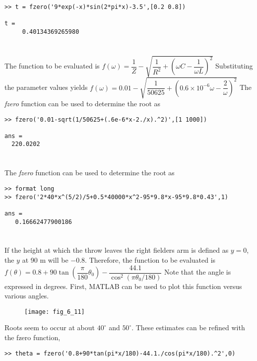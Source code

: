 \documentclass[../main.tex]{subfiles}
\begin{document}
\begin{enumerate}[label=\bfseries(\alph*)]
\begin{lstlisting}[numbers=none]
>> t = fzero('9*exp(-x)*sin(2*pi*x)-3.5',[0.2 0.8])

t =
 	 0.40134369265980
\end{lstlisting}
\bigbreak

\section{}
The function to be evaluated is
\bigbreak
$f(\omega)=\dfrac{1}{Z}-\sqrt{\dfrac{1}{R^{2}}+\left(\omega C-\dfrac{1}{\omega L}\right)^{2}}$
\bigbreak
Substituting the parameter values yields
\bigbreak
$f(\omega)=0.01-\sqrt{\dfrac{1}{50625}+\left(0.6 \times 10^{-6} \omega-\dfrac{2}{\omega}\right)^{2}}$
\bigbreak
The \textit {fzero} function can be used to determine the root as
\bigbreak
\begin{lstlisting}[numbers=none]
>> fzero('0.01-sqrt(1/50625+(.6e-6*x-2./x).^2)',[1 1000])

ans =
  220.0202
\end{lstlisting}
\bigbreak


\section{}
The \textit {fzero} function can be used to determine the root as
\bigbreak
\begin{lstlisting}[numbers=none]
>> format long
>> fzero('2*40*x^(5/2)/5+0.5*40000*x^2-95*9.8*x-95*9.8*0.43',1)

ans =
   0.16662477900186
\end{lstlisting}
\bigbreak

\section{}
If the height at which the throw leaves the right fielders arm is defined as $y=0$, the $y$ at 90 $\mathrm{m}$ will be $-0.8$. Therefore, the function to be evaluated is
\bigbreak
$f(\theta)=0.8+90 \tan \left(\dfrac{\pi}{180} \theta_{0}\right)-\dfrac{44.1}{\cos ^{2}\left(\pi \theta_{0} / 180\right)}$
\bigbreak
Note that the angle is expressed in degrees. First, MATLAB can be used to plot this function versus various angles.
\bigbreak
\begin{figure}[H]
		\hspace*{0.8cm}\texttt{[image: fig\_6\_11]}
		\label{fig:fig_6_11}
	\end{figure}
	\bigbreak
Roots seem to occur at about $40^{\circ}$ and $50^{\circ}$. These estimates can be refined with the fzero function,
\bigbreak
\begin{lstlisting}[numbers=none]
>> theta = fzero('0.8+90*tan(pi*x/180)-44.1./cos(pi*x/180).^2',0)


\end{lstlisting}
\end{enumerate}
\end{document}
